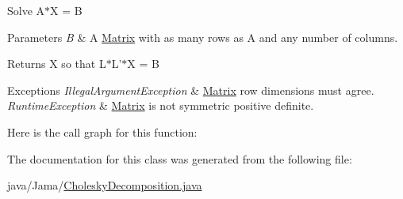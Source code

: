 Solve A$\ast$\+X = B 
\begin{DoxyParams}{Parameters}
{\em B} & A \hyperlink{class_jama_1_1_matrix}{Matrix} with as many rows as A and any number of columns. \\
\hline
\end{DoxyParams}
\begin{DoxyReturn}{Returns}
X so that L$\ast$\+L'$\ast$\+X = B 
\end{DoxyReturn}

\begin{DoxyExceptions}{Exceptions}
{\em Illegal\+Argument\+Exception} & \hyperlink{class_jama_1_1_matrix}{Matrix} row dimensions must agree. \\
\hline
{\em Runtime\+Exception} & \hyperlink{class_jama_1_1_matrix}{Matrix} is not symmetric positive definite. \\
\hline
\end{DoxyExceptions}


Here is the call graph for this function\+:




The documentation for this class was generated from the following file\+:\begin{DoxyCompactItemize}
\item 
java/\+Jama/\hyperlink{_cholesky_decomposition_8java}{Cholesky\+Decomposition.\+java}\end{DoxyCompactItemize}
